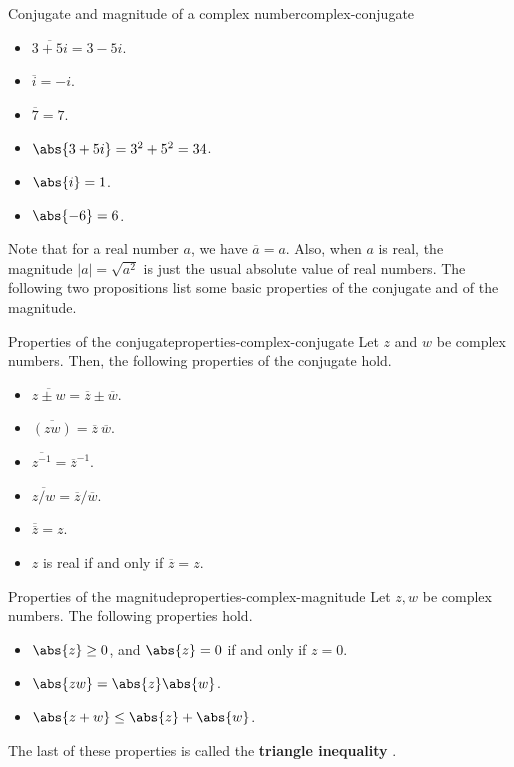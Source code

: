 \begin{example}{Conjugate and magnitude of a complex number}{complex-conjugate}
  \begin{itemize}
  \item $\overline{3+5i} = 3-5i$.
  \item $\overline{i} = -i$.
  \item $\overline{7} = 7$.
  \item $\abs{3+5i} = 3^2+5^2 = 34$.
  \item $\abs{i} = 1$.
  \item $\abs{-6} = 6$.
  \end{itemize}
\end{example}

Note that for a real number $a$, we have $\overline{a}=a$. Also, when
$a$ is real, the magnitude $|a| = \sqrt{a^2}$ is just the usual
absolute value of real numbers. The following two propositions
list some basic properties of the conjugate and of the magnitude.

\begin{proposition}{Properties of the conjugate}{properties-complex-conjugate}
  Let $z$ and $w$ be complex numbers. Then, the following properties
  of the conjugate hold.%
  \begin{itemize}
  \item $\overline{z\pm w} = \overline{z} \pm \overline{w}$.
  \item $\overline{(zw)} = \overline{z}~ \overline{w}$.
  \item $\overline{z^{-1}} = \overline{z}^{-1}$.
  \item $\overline{z/w} = \overline{z} / \overline{w}$.
  \item $\overline{\overline{z}}=z$.
  \item $z$ is real if and only if $\overline{z}=z$.
  \end{itemize}
\end{proposition}

\begin{proposition}{Properties of the magnitude}{properties-complex-magnitude}
  Let $z,w$ be complex numbers.  The following properties hold.%
  \begin{itemize}
  \item $\abs{z} \geq 0$, and $\abs{z}=0$ if and only if $z=0$.
  \item $\abs{zw} = \abs{z}\abs{w}$.
  \item $\abs{z+w} \leq \abs{z} +\abs{w}$.
  \end{itemize}
  The last of these properties is called the \textbf{triangle
    inequality}%
  .
\end{proposition}

